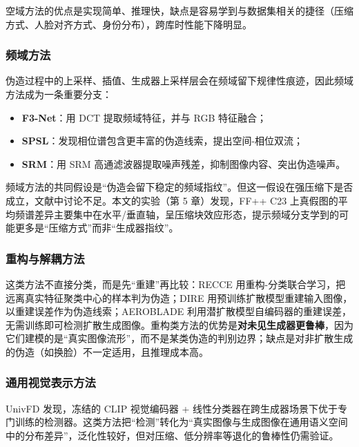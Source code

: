 空域方法的优点是实现简单、推理快，缺点是容易学到与数据集相关的捷径（压缩方式、人脸对齐方式、身份分布），跨库时性能下降明显。

\subsubsection{频域方法}

伪造过程中的上采样、插值、生成器上采样层会在频域留下规律性痕迹，因此频域方法成为一条重要分支：

\begin{itemize}
  \item \textbf{F3-Net}\cite{qian2020f3net}：用 DCT 提取频域特征，并与 RGB 特征融合；
  \item \textbf{SPSL}\cite{liu2021spsl}：发现相位谱包含更丰富的伪造线索，提出空间-相位双流；
  \item \textbf{SRM}\cite{luo2021srm}：用 SRM 高通滤波器提取噪声残差，抑制图像内容、突出伪造噪声。
\end{itemize}

频域方法的共同假设是“伪造会留下稳定的频域指纹”。但这一假设在强压缩下是否成立，文献中讨论不足。本文的实验（第 5 章）发现，FF++ C23 上真假图的平均频谱差异主要集中在水平/垂直轴，呈压缩块效应形态，提示频域分支学到的可能更多是“压缩方式”而非“生成器指纹”。

\subsubsection{重构与解耦方法}

这类方法不直接分类，而是先“重建”再比较：RECCE\cite{cao2022recce} 用重构-分类联合学习，把远离真实特征聚类中心的样本判为伪造；DIRE\cite{wang2023dire} 用预训练扩散模型重建输入图像，以重建误差作为伪造线索；AEROBLADE\cite{ricker2024aeroblade} 利用潜扩散模型自编码器的重建误差，无需训练即可检测扩散生成图像。重构类方法的优势是\textbf{对未见生成器更鲁棒}，因为它们建模的是“真实图像流形”，而不是某类伪造的判别边界；缺点是对非扩散生成的伪造（如换脸）不一定适用，且推理成本高。

\subsubsection{通用视觉表示方法}

UnivFD\cite{ojha2023univfd} 发现，冻结的 CLIP 视觉编码器 + 线性分类器在跨生成器场景下优于专门训练的检测器。这类方法把“检测”转化为“真实图像与生成图像在通用语义空间中的分布差异”，泛化性较好，但对压缩、低分辨率等退化的鲁棒性仍需验证。

